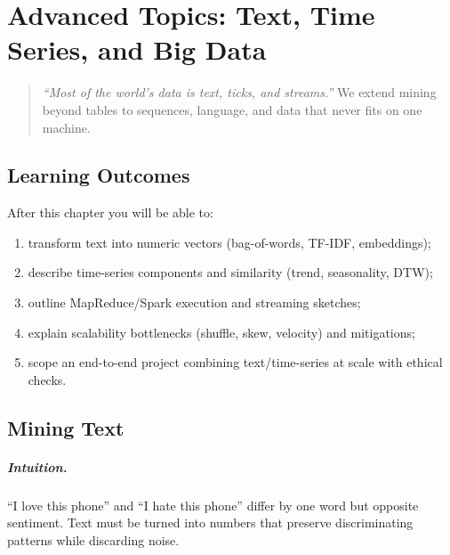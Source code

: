 \chapter{Advanced Topics: Text, Time Series, and Big Data}
\label{ch:advanced}

\begin{quote}
\emph{``Most of the world's data is text, ticks, and streams.''} We extend mining beyond tables to sequences, language, and data that never fits on one machine.
\end{quote}

\noindent{}
\vspace{0.4em}

\section*{Learning Outcomes}
After this chapter you will be able to:
\begin{enumerate}[label=(L\arabic*)]
    \item transform text into numeric vectors (bag-of-words, TF-IDF, embeddings);
    \item describe time-series components and similarity (trend, seasonality, DTW);
    \item outline MapReduce/Spark execution and streaming sketches;
    \item explain scalability bottlenecks (shuffle, skew, velocity) and mitigations;
    \item scope an end-to-end project combining text/time-series at scale with ethical checks.
\end{enumerate}

\section{Mining Text}
\label{sec:text}
\paragraph{Intuition.} ``I love this phone'' and ``I hate this phone'' differ by one word but opposite sentiment. Text must be turned into numbers that preserve discriminating patterns while discarding noise.

